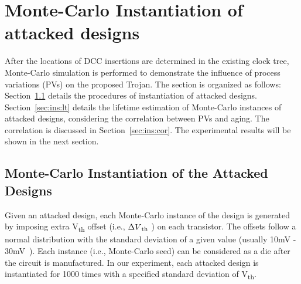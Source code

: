 \section{Monte-Carlo Instantiation of attacked designs}
\label{sec:ins}
After the locations of DCC insertions are determined in the existing clock tree, Monte-Carlo simulation is performed to demonstrate the influence of process variations (PVs) on the proposed Trojan. The section is organized as follows: Section~\ref{sec:ins:mc_ins} details the procedures of instantiation of attacked designs. Section~\ref{sec:ins:lt} details the lifetime estimation of Monte-Carlo instances of attacked designs, considering the correlation between PVs and aging. The correlation is discussed in Section~\ref{sec:ins:cor}. The experimental results will be shown in the next section.

\subsection{Monte-Carlo Instantiation of the Attacked Designs}
\label{sec:ins:mc_ins}
Given an attacked design, each Monte-Carlo instance of the design is generated by imposing extra V\textsubscript{th} offset (i.e., $\Delta V\textsubscript{th}$ ) on each transistor. The offsets follow a normal distribution with the standard deviation of a given value (usually 10mV - 30mV~\cite{han2011statistical}\cite{schlunder2017influence}). Each instance (i.e., Monte-Carlo seed) can be considered as a die after the circuit is manufactured. In our experiment, each attacked design is instantiated for 1000 times with a specified standard deviation of V\textsubscript{th}. 

